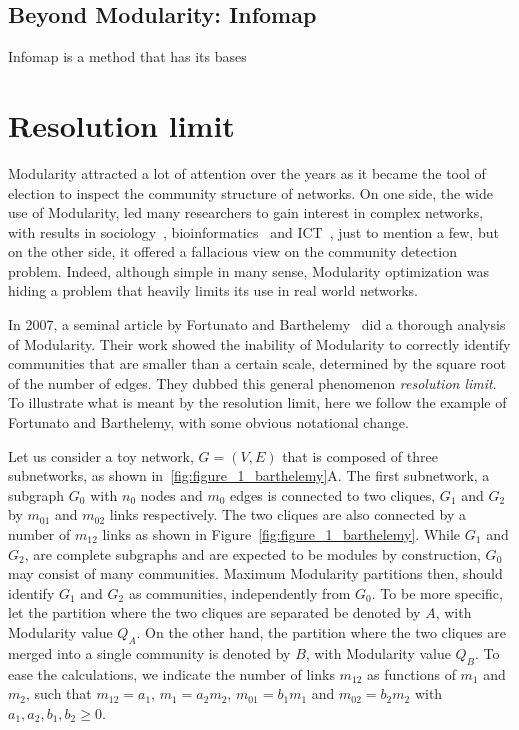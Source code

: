 \subsection{Beyond Modularity: Infomap}
Infomap is a method that has its bases

\section{Resolution limit}\label{sec:resolutionlimit}
Modularity attracted a lot of attention over the years as it became the tool of election to inspect the community structure of networks.
On one side, the wide use of Modularity, led many researchers to gain interest in complex networks, with results in sociology~\cite{li2008tag}, bioinformatics~\cite{saracc2012topology} and ICT~\cite{java2007we,leskovec2007dynamics}, just to mention a few, but on the other side, it offered a fallacious view on the community detection problem.
Indeed, although simple in many sense, Modularity optimization was hiding a problem that heavily limits its use in real world networks.

In 2007, a seminal article by Fortunato and Barthelemy~\cite{fortunato2007} did a thorough analysis of Modularity.
Their work showed the inability of Modularity to correctly identify communities that are smaller than a certain scale, determined by the square root of the number of edges. They dubbed this general phenomenon \emph{resolution limit}.
To illustrate what is meant by the resolution limit, here we follow the example of Fortunato and Barthelemy, with some obvious notational change.

Let us consider a toy network, $G=(V, E)$ that is composed of three subnetworks, as shown in~\ref{fig:figure_1_barthelemy}A.
The first subnetwork, a subgraph $G_0$ with $n_0$ nodes and $m_0$ edges is connected to two cliques, $G_1$ and $G_2$ by $m_{01}$ and $m_{02}$ links respectively. The two cliques are also connected by a number of $m_{12}$ links as shown in Figure~\ref{fig:figure_1_barthelemy}.
While $G_1$ and $G_2$, are complete subgraphs and are expected to be modules by construction, $G_0$ may consist of many communities. Maximum Modularity partitions then, should identify $G_1$ and $G_2$ as communities, independently from $G_0$.
To be more specific, let the partition where the two cliques are separated be denoted by $A$, with Modularity value $Q_A$. On the other hand, the partition where the two cliques are merged into a single community is denoted by $B$, with Modularity value $Q_B$.
To ease the calculations, we indicate the number of links $m_{12}$ as functions of $m_1$ and $m_2$, such that $m_{12}=a_{1}$, $m_1=a_2 m_2$, $m_{01}=b_1 m_1$ and $m_{02}=b_2 m_2$ with $a_1,a_2,b_1,b_2 \geq 0$.

